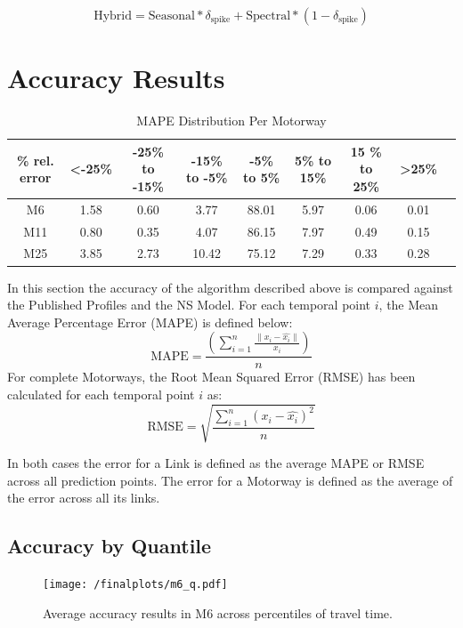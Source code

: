 \documentclass[conference, letterpaper]{IEEEtran}
\begin{document}
\begin{equation}
\textrm{Hybrid} = \textrm{Seasonal} * \delta_{\textrm{spike}} + \textrm{Spectral} * (1 - \delta_{\textrm{spike}})
\end{equation}

\section{Accuracy Results}
\begin{table}[bp]
	\caption{MAPE Distribution Per Motorway}
	\centering
	\begin{center}
		\begin{tabular}{|C|C|C|C|C|C|C|C|C|}
			\hline
			\textbf{\% rel. error}&{\textless -25\%}&{-25\%\textbf{ to }-15\%}&{-15\%\textbf{ to }-5\%}&{-5\%\textbf{ to }5\%}&{5\%\textbf{ to }15\%}&{15 \%\textbf{ to }25\%}&{\textgreater 25\%}\\
			\hline
			M6& 1.58& 0.60& 3.77& 88.01& 5.97& 0.06& 0.01\\
			\hline
			M11& 0.80& 0.35& 4.07& 86.15& 7.97& 0.49& 0.15\\
			\hline
			M25& 3.85& 2.73& 10.42& 75.12& 7.29& 0.33& 0.28\\
			\hline
		\end{tabular}
		\label{mapeglobal}
	\end{center}
\end{table}
  
In this section the accuracy of the algorithm described above is compared against the Published Profiles and the NS Model. 
For each temporal point $i$, the Mean Average Percentage Error (MAPE) is defined below:
\begin{equation}
\textrm{MAPE} =\frac{ \left( \sum_{i=1}^{n} \frac{\|x_i - \hat{x_i}\|}{x_i}\right)}{n}
\end{equation}
For complete Motorways, the Root Mean Squared Error (RMSE) has been calculated for each temporal point $i$ as:
\begin{equation}
\textrm{RMSE} = \sqrt{\frac{\sum_{i=1}^{n} (x_i - \hat{x_i})^2}{n}}
\end{equation}

In both cases the error for a Link is defined as the average MAPE or RMSE across all prediction points.
The error for a Motorway is defined as the average of the error across all its links.
\subsection{Accuracy by Quantile}
\begin{figure}[htbp]
	\centerline{\texttt{[image: /finalplots/m6\_q.pdf]}}
	\caption{Average accuracy results in M6 across percentiles of travel time.}
	\label{fig:m6q}
\end{figure}
\end{document}

